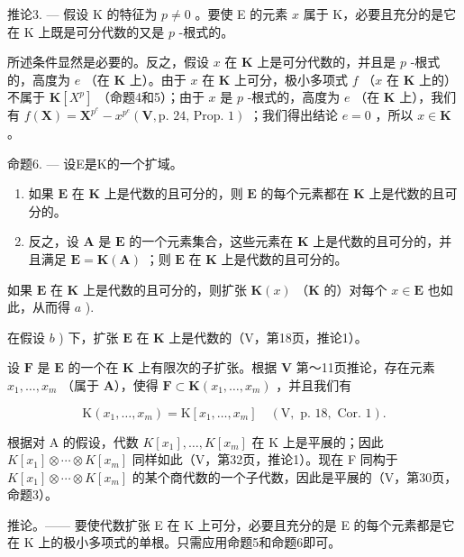 推论3. --- 假设 K 的特征为 \(p \neq 0\) 。要使 E 的元素 \(x\) 属于 K，必要且充分的是它在 K 上既是可分代数的又是 \(p\) -根式的。

所述条件显然是必要的。反之，假设 \(x\) 在 \(\mathbf{K}\) 上是可分代数的，并且是 \(p\) -根式的，高度为 \(e\) （在 \(\mathbf{K}\) 上）。由于 \(x\) 在 \(\mathbf{K}\) 上可分，极小多项式 \(f\) （\(x\) 在 \(\mathbf{K}\) 上的）不属于 \(\mathbf{K}[X^p]\) （命题4和5）；由于 \(x\) 是 \(p\) -根式的，高度为 \(e\) （在 \(\mathbf{K}\) 上），我们有 \(f(\mathbf{X}) = \mathbf{X}^{p^e} - x^{p^e}(\mathbf{V},\text{p. 24, Prop. 1})\) ；我们得出结论 \(e = 0\) ，所以 \(x \in \mathbf{K}\) 。

命题6. --- 设E是K的一个扩域。

\begin{enumerate}
\def\labelenumi{\alph{enumi})}
\item
  如果 \(\mathbf{E}\) 在 \(\mathbf{K}\) 上是代数的且可分的，则 \(\mathbf{E}\) 的每个元素都在 \(\mathbf{K}\) 上是代数的且可分的。
\item
  反之，设 \(\mathbf{A}\) 是 \(\mathbf{E}\) 的一个元素集合，这些元素在 \(\mathbf{K}\) 上是代数的且可分的，并且满足 \(\mathbf{E} = \mathbf{K}(\mathbf{A})\) ；则 \(\mathbf{E}\) 在 \(\mathbf{K}\) 上是代数的且可分的。
\end{enumerate}

如果 \(\mathbf{E}\) 在 \(\mathbf{K}\) 上是代数的且可分的，则扩张 \(\mathbf{K}(x)\) （\(\mathbf{K}\) 的）对每个 \(x \in \mathbf{E}\) 也如此，从而得 \(a\) ).

在假设 \(b\) ) 下，扩张 \(\mathbf{E}\) 在 \(\mathbf{K}\) 上是代数的（V，第18页，推论1）。

设 \(\mathbf{F}\) 是 \(\mathbf{E}\) 的一个在 \(\mathbf{K}\) 上有限次的子扩张。根据 \(\mathbf{V}\) 第～11页推论，存在元素 \(x_{1},\ldots ,x_{m}\) （属于 \(\mathbf{A}\)），使得 \(\mathbf{F}\subset \mathbf{K}(x_1,\dots,x_m)\) ，并且我们有

\[
\mathrm{K} \left(x _ {1}, \dots , x _ {m}\right) = \mathrm{K} \left[ x _ {1}, \dots , x _ {m} \right] \quad (\mathrm{V}, \text { p. } 1 8, \text { Cor. } 1).
\]

根据对 A 的假设，代数 \(K[x_{1}], \ldots, K[x_{m}]\) 在 K 上是平展的；因此 \(K[x_{1}] \otimes \cdots \otimes K[x_{m}]\) 同样如此（V，第32页，推论1）。现在 F 同构于 \(K[x_{1}] \otimes \cdots \otimes K[x_{m}]\) 的某个商代数的一个子代数，因此是平展的（V，第30页，命题3）。

推论。—— 要使代数扩张 E 在 K 上可分，必要且充分的是 E 的每个元素都是它在 K 上的极小多项式的单根。只需应用命题5和命题6即可。

